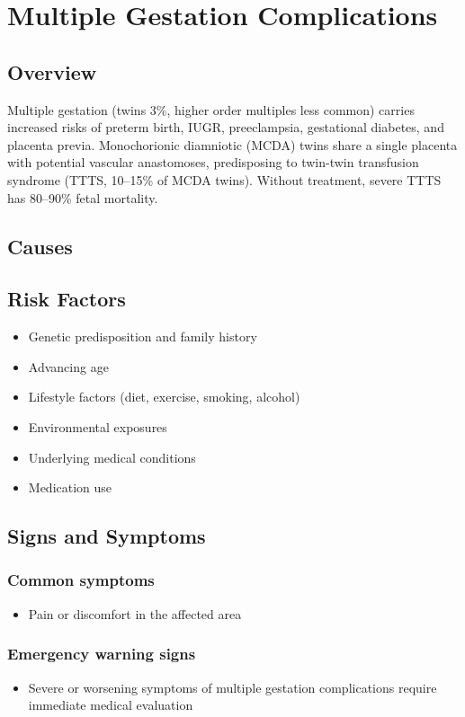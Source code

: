 \chapter{Multiple Gestation Complications}
\label{sec:Multiple Gestation Complications}

\section{Overview}
Multiple gestation (twins 3\%, higher order multiples less common) carries increased risks of preterm birth, IUGR, preeclampsia, gestational diabetes, and placenta previa. Monochorionic diamniotic (MCDA) twins share a single placenta with potential vascular anastomoses, predisposing to twin-twin transfusion syndrome (TTTS, 10--15\% of MCDA twins). Without treatment, severe TTTS has 80--90\% fetal mortality.
\section{Causes}
\section{Risk Factors}

\begin{itemize}[noitemsep]
  \item Genetic predisposition and family history
  \item Advancing age
  \item Lifestyle factors (diet, exercise, smoking, alcohol)
  \item Environmental exposures
  \item Underlying medical conditions
  \item Medication use
\end{itemize}
\section{Signs and Symptoms}

\subsection{Common symptoms}
\begin{itemize}[noitemsep]
  \item Pain or discomfort in the affected area
  \end{itemize}

\subsection{Emergency warning signs}
\begin{itemize}[noitemsep]
  \item Severe or worsening symptoms of multiple gestation complications require immediate medical evaluation
\end{itemize}
